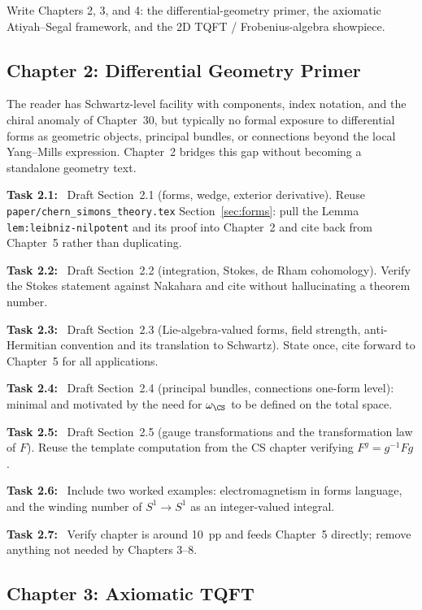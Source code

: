 \documentclass[11pt]{article}
\newcommand{\task}[1]{\medskip\noindent\textbf{Task #1:}\ }
\begin{document}
\begin{goalbox}[Objective]
Write Chapters 2, 3, and 4: the differential-geometry primer, the axiomatic
Atiyah--Segal framework, and the 2D TQFT / Frobenius-algebra showpiece.
\end{goalbox}

\subsection{Chapter 2: Differential Geometry Primer}

\begin{insight}
The reader has Schwartz-level facility with components, index notation, and the chiral
anomaly of Chapter~30, but typically no formal exposure to differential forms as
geometric objects, principal bundles, or connections beyond the local Yang--Mills
expression. Chapter~2 bridges this gap without becoming a standalone geometry text.
\end{insight}

\task{2.1} Draft Section~2.1 (forms, wedge, exterior derivative). Reuse
\texttt{paper/chern\_simons\_theory.tex} Section~\ref{sec:forms}: pull the Lemma
\texttt{lem:leibniz-nilpotent} and its proof into Chapter~2 and cite back from
Chapter~5 rather than duplicating.

\task{2.2} Draft Section~2.2 (integration, Stokes, de Rham cohomology). Verify the
Stokes statement against Nakahara and cite without hallucinating a theorem number.

\task{2.3} Draft Section~2.3 (Lie-algebra-valued forms, field strength, anti-Hermitian
convention and its translation to Schwartz). State once, cite forward to Chapter~5 for
all applications.

\task{2.4} Draft Section~2.4 (principal bundles, connections one-form level): minimal
and motivated by the need for $\omega_{\CS}$ to be defined on the total space.

\task{2.5} Draft Section~2.5 (gauge transformations and the transformation law of $F$).
Reuse the template computation from the CS chapter verifying $F^g=g^{-1}Fg$.

\task{2.6} Include two worked examples: electromagnetism in forms language, and the
winding number of $S^1\to S^1$ as an integer-valued integral.

\task{2.7} Verify chapter is around 10~pp and feeds Chapter~5 directly; remove anything
not needed by Chapters 3--8.

\subsection{Chapter 3: Axiomatic TQFT}
\end{document}
